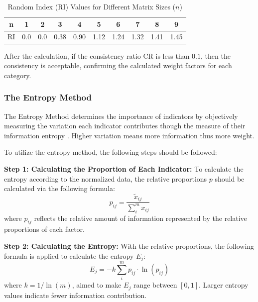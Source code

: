 \documentclass{mcmthesis}
\begin{document}
\begin{table}[!h]
\begin{center}

\caption{Random Index ($\text{RI}$) Values for Different Matrix Sizes ($n$)}
\label{tab:AHP_RI_values}
\setlength{\tabcolsep}{12pt} 
\begin{tabular}{cccccccccc}
\toprule
n & 1 & 2 & 3 & 4 & 5 & 6 & 7 & 8 & 9 \\
\midrule
RI & 0.0 & 0.0 & 0.38 & 0.90 & 1.12 & 1.24 & 1.32 & 1.41 & 1.45 \\
\bottomrule
\end{tabular}
\end{center}
\end{table}

After the calculation, if the consistency ratio $\text{CR}$ is less than $0.1$, then the consistency is acceptable, confirming the calculated weight factors for each category. 

\subsubsection{The Entropy Method} \label{subsubsec:entropy}

The Entropy Method determines the importance of indicators by objectively measuring the variation each indicator contributes though the measure of their information entropy \cite{Entropy}. Higher variation means more information thus more weight. 

To utilize the entropy method, the following steps should be followed: 

\textbf{Step 1: Calculating the Proportion of Each Indicator:} To calculate the entropy according to the normalized data, the relative proportions $p$ should be calculated via the following formula:  
\begin{equation} \label{eq:entropy_proportions}
    p_{ij} = \frac{\tilde{x}_{ij}}{\sum^m_i x_{ij}}
\end{equation}
where $p_{ij}$ reflects the relative amount of information represented by the relative proportions of each factor.

\textbf{Step 2: Calculating the Entropy:} With the relative proportions, the following formula is applied to calculate the entropy $E_j$: 
\begin{equation} \label{eq:entropy_entropy_values}
    E_j = -k \sum^m_i p_{ij} \cdot \ln(p_{ij}) 
\end{equation}
where $k = 1/\ln (m)$, aimed to make $E_j$ range between $[0,1]$. Larger entropy values indicate fewer information contribution.
\end{document}
